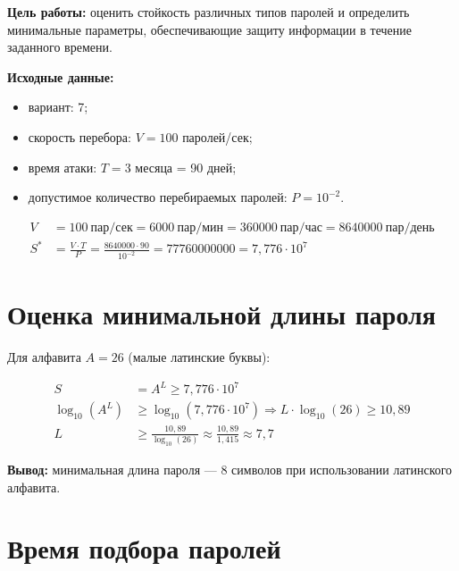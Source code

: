 \documentclass{bsuir}
\begin{document}
\maketitle
\mainmatter

\textbf{Цель работы:} оценить стойкость различных типов паролей и определить минимальные параметры, обеспечивающие защиту информации в течение заданного времени.

\textbf{Исходные данные:}

\begin{itemize}
	\item вариант: 7;
	\item скорость перебора: $V = 100$ паролей/сек;
	\item время атаки: $T = 3$ месяца = 90 дней;
	\item допустимое количество перебираемых паролей: $P = 10^{-2}$.
\end{itemize}

\[
	\begin{aligned}
		V   & = 100~\text{пар/сек} = 6000~\text{пар/мин} = 360000~\text{пар/час} = 8640000~\text{пар/день} \\
		S^* & = \frac{V \cdot T}{P} = \frac{8640000 \cdot 90}{10^{-2}} = 77760000000 = 7{,}776 \cdot 10^7
	\end{aligned}
\]

\section{Оценка минимальной длины пароля}

Для алфавита $A = 26$ (малые латинские буквы):

\[
	\begin{aligned}
		S              & = A^L \geq 7{,}776 \cdot 10^7                                                     \\
		\log_{10}(A^L) & \geq \log_{10}(7{,}776 \cdot 10^7) \Rightarrow L \cdot \log_{10}(26) \geq 10{,}89 \\
		L              & \geq \frac{10{,}89}{\log_{10}(26)} \approx \frac{10{,}89}{1{,}415} \approx 7{,}7
	\end{aligned}
\]

\textbf{Вывод:} минимальная длина пароля — 8 символов при использовании латинского алфавита.

\section{Время подбора паролей}
\end{document}
